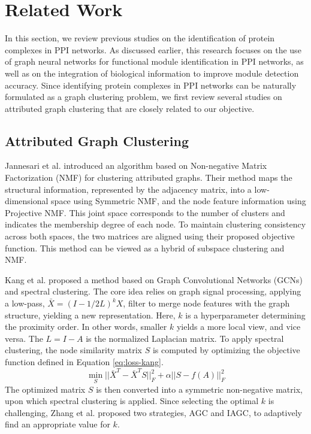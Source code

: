 \section{Related Work}
In this section, we review previous studies on the identification of protein complexes in PPI networks. As discussed earlier, this research focuses on the use of graph neural networks for functional module identification in PPI networks, as well as on the integration of biological information to improve module detection accuracy. Since identifying protein complexes in PPI networks can be naturally formulated as a graph clustering problem, we first review several studies on attributed graph clustering that are closely related to our objective.

\subsection{Attributed Graph Clustering}
Jannesari et al. \cite{nonnegative} introduced an algorithm based on Non-negative Matrix Factorization (NMF) for clustering attributed graphs. Their method maps the structural information, represented by the adjacency matrix, into a low-dimensional space using Symmetric NMF, and the node feature information using Projective NMF. This joint space corresponds to the number of clusters and indicates the membership degree of each node. To maintain clustering consistency across both spaces, the two matrices are aligned using their proposed objective function. This method can be viewed as a hybrid of subspace clustering and NMF.

Kang et al. \cite{fine} proposed a method based on Graph Convolutional Networks (GCNs) and spectral clustering. The core idea relies on graph signal processing, applying a low-pass, $\bar{X} = (I - 1/2 L)^k X$, filter to merge node features with the graph structure, yielding a new representation.   
Here, $k$ is a hyperparameter determining the proximity order. In other words, smaller $k$ yields a more local view, and vice versa. The $L = I - A$ is the normalized Laplacian matrix. To apply spectral clustering, the node similarity matrix $S$ is computed by optimizing the objective function defined in Equation \ref{eq:loss-kang}.
\begin{equation}
	\min_S ||\bar{X}^T - \bar{X}^T S||_F^2 + \alpha||S - f(A)||_F^2
	\label{eq:loss-kang}    
\end{equation}
The optimized matrix $S$ is then converted into a symmetric non-negative matrix, upon which spectral clustering is applied. Since selecting the optimal $k$ is challenging, Zhang et al. \cite{adaptive} proposed two strategies, AGC and IAGC, to adaptively find an appropriate value for $k$.

